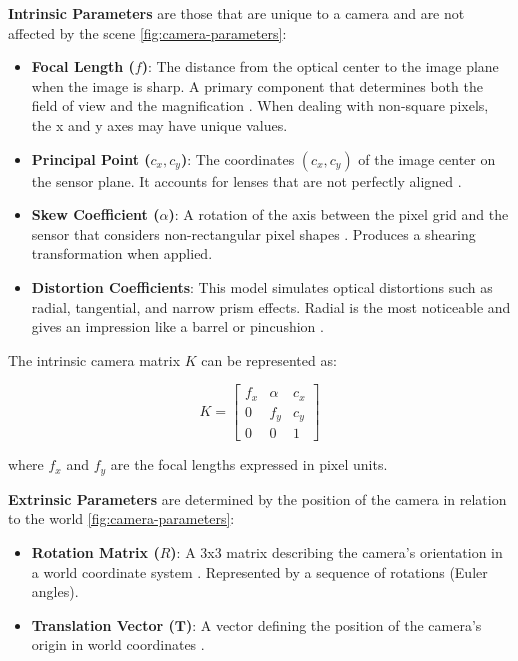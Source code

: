 \vspace{10pt}

\textbf{Intrinsic Parameters} are those that are unique to a camera and are not affected by the scene \ref{fig:camera-parameters}:
\begin{itemize}
  \item \textbf{Focal Length ($f$)}: The distance from the optical center to the image plane when the image is sharp. A primary component that determines both the field of view and the magnification \cite{Heikkila1997}. When dealing with non-square pixels, the x and y axes may have unique values.
  \item \textbf{Principal Point ($c_x, c_y$)}: The coordinates $(c_x, c_y)$ of the image center on the sensor plane. It accounts for lenses that are not perfectly aligned \cite{Heikkila1997}.
  \item \textbf{Skew Coefficient ($\alpha$)}: A rotation of the axis between the pixel grid and the sensor that considers non-rectangular pixel shapes \cite{Heikkila1997}. Produces a shearing transformation when applied.
  \item \textbf{Distortion Coefficients}: This model simulates optical distortions such as radial, tangential, and narrow prism effects. Radial is the most noticeable and gives an impression like a barrel or pincushion \cite{Heikkila1997}.
\end{itemize}

The intrinsic camera matrix $K$ can be represented as:

\begin{equation}
K = \begin{bmatrix}
f_x & \alpha & c_x \\
0 & f_y & c_y \\
0 & 0 & 1
\end{bmatrix}
\end{equation}

where $f_x$ and $f_y$ are the focal lengths expressed in pixel units.

\vspace{30pt}

\textbf{Extrinsic Parameters} are determined by the position of the camera in relation to the world \ref{fig:camera-parameters}:
\begin{itemize}
  \item \textbf{Rotation Matrix ($R$)}: A 3x3 matrix describing the camera's orientation in a world coordinate system \cite{Zhang2000}. Represented by a sequence of rotations (Euler angles).
  \item \textbf{Translation Vector ($\mathbf{T}$)}: A vector defining the position of the camera's origin in world coordinates \cite{Zhang2000}.
\end{itemize}

